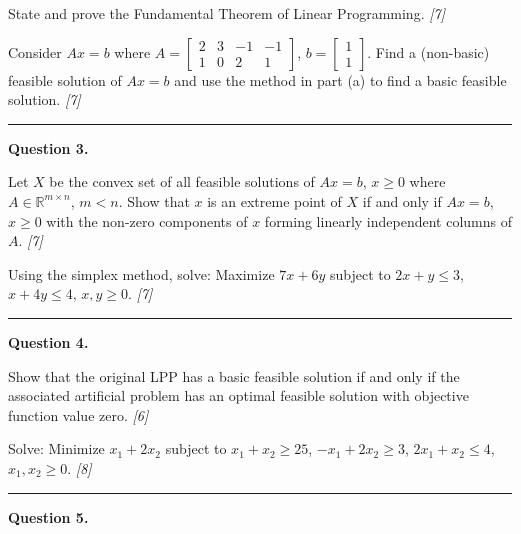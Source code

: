 \documentclass[11pt,a4paper]{article}
\newcommand{\pts}[1]{\hfill   \textit{[#1]}}
\begin{document}
\begin{parts}
  \item State and prove the Fundamental Theorem of Linear Programming. \pts{7}
  \item Consider $Ax = b$ where $A = 
\begin{bmatrix}2 & 3 & -1 & -1\\1 & 0 & 2 & 1\end{bmatrix}$, $b = 
\begin{bmatrix}1\\1\end{bmatrix}$. Find a (non-basic) feasible solution of $Ax = b$ and use the method in part (a) to find a basic feasible solution. \pts{7}
\end{parts}

\medskip\rule{\linewidth}{0.2pt}

\medskip


\noindent   \textbf{Question 3.}

\begin{parts}
  \item Let $X$ be the convex set of all feasible solutions of $Ax = b$, $x \ge 0$ where $A \in \mathbb{R}^{m  \times n}$, $m < n$. Show that $x$ is an extreme point of $X$ if and only if $Ax = b$, $x \ge 0$ with the non-zero components of $x$ forming linearly independent columns of $A$. \pts{7}
  \item Using the simplex method, solve: Maximize $7x + 6y$ subject to $2x + y \le 3$, $x + 4y \le 4$, $x, y \ge 0$. \pts{7}
\end{parts}

\medskip\rule{\linewidth}{0.2pt}

\medskip


\noindent   \textbf{Question 4.}

\begin{parts}
  \item Show that the original LPP has a basic feasible solution if and only if the associated artificial problem has an optimal feasible solution with objective function value zero. \pts{6}
  \item Solve: Minimize $x_1 + 2x_2$ subject to $x_1 + x_2 \ge 25$, $-x_1 + 2x_2 \ge 3$, $2x_1 + x_2 \le 4$, $x_1, x_2 \ge 0$. \pts{8}
\end{parts}

\medskip\rule{\linewidth}{0.2pt}

\medskip


\noindent   \textbf{Question 5.}
\end{document}
